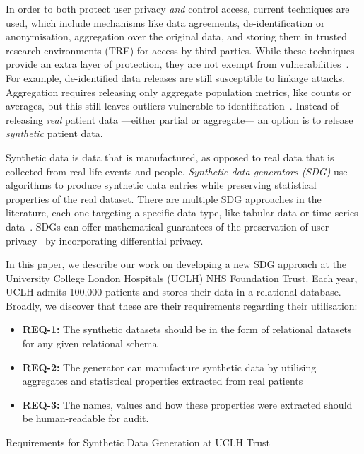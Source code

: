 \documentclass[11pt]{article}
\begin{document}
In order to both protect user privacy \emph{and} control access, current techniques are used, which include mechanisms like data agreements, de-identification or anonymisation, aggregation over the original data, and storing them in trusted research environments (TRE) for access by third parties. While these techniques provide an extra layer of protection, they are not exempt from vulnerabilities~\cite{near2021}. For example, de-identified data releases are still susceptible to linkage attacks. Aggregation requires releasing only aggregate population metrics, like counts or averages, but this still leaves outliers vulnerable to identification~\cite{tucker2020}. Instead of releasing \emph{real} patient data ---either partial or aggregate--- an option is to release \emph{synthetic} patient data. 

Synthetic data is data that is manufactured, as opposed to real data that is collected from real-life events and people. \emph{Synthetic data generators (SDG)} use algorithms to produce synthetic data entries while preserving statistical properties of the real dataset. There are multiple SDG approaches in the literature, each one targeting a specific data type, like tabular data or time-series data~\cite{DBLP:journals/corr/abs-2205-03257}.
SDGs can offer mathematical guarantees of the preservation of user privacy~\cite{Kopp2021MicrosoftSD, Cai2023} by incorporating differential privacy.

In this paper, we describe our work on developing a new SDG approach at the University College London Hospitals (UCLH) NHS Foundation Trust. Each year, UCLH admits 100,000 patients and stores their data in a relational database. Broadly, we discover that these are their requirements regarding their utilisation:

\begin{listing}[ht]
\begin{itemize}
    \item \textbf{REQ-1:} The synthetic datasets should be in the form of relational datasets for any given relational schema
    \item \textbf{REQ-2:} The generator can manufacture synthetic data by utilising aggregates and statistical properties extracted from real patients
    \item \textbf{REQ-3:} The names, values and how these properties were extracted should be human-readable for audit. 
\end{itemize}
\caption{Requirements for Synthetic Data Generation at UCLH Trust}
\label{lst:UCLH Requirements}
\end{listing}
\end{document}
